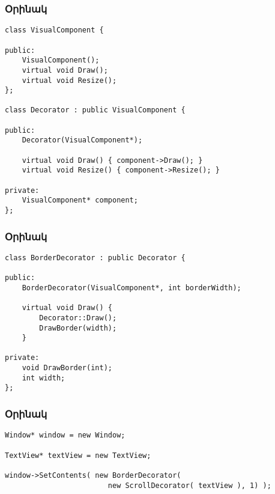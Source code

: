 \documentclass{beamer}
\begin{document}
\begin{frame}[fragile]\frametitle{Օրինակ}
\begin{english}
\begin{verbatim}
class VisualComponent {

public:
    VisualComponent();
    virtual void Draw();
    virtual void Resize();
};

class Decorator : public VisualComponent {

public:
    Decorator(VisualComponent*);

    virtual void Draw() { component->Draw(); }
    virtual void Resize() { component->Resize(); }

private:
    VisualComponent* component;
};
\end{verbatim}
\end{english}
\end{frame}

\begin{frame}[fragile]\frametitle{Օրինակ}
\begin{english}
\begin{verbatim}
class BorderDecorator : public Decorator {

public:
    BorderDecorator(VisualComponent*, int borderWidth);

    virtual void Draw() {
        Decorator::Draw();
        DrawBorder(width);
    }

private:
    void DrawBorder(int);
    int width;
};
\end{verbatim}
\end{english}
\end{frame}

\begin{frame}[fragile]\frametitle{Օրինակ}
\begin{english}
\begin{verbatim}
Window* window = new Window;

TextView* textView = new TextView;

window->SetContents( new BorderDecorator(
                        new ScrollDecorator( textView ), 1) );
\end{verbatim}
\end{english}
\end{frame}
\end{document}
